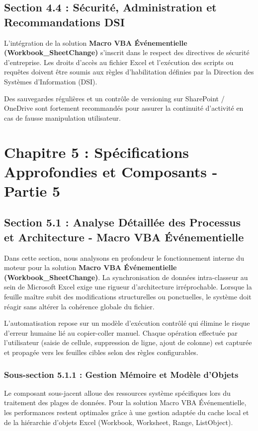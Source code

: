 \documentclass[12pt,a4paper]{report}
\begin{document}
\section{Section 4.4 : Sécurité, Administration et Recommandations DSI}
L'intégration de la solution \textbf{Macro VBA Événementielle (Workbook\_SheetChange)} s'inscrit dans le respect des directives de sécurité d'entreprise. Les droits d'accès au fichier Excel et l'exécution des scripts ou requêtes doivent être soumis aux règles d'habilitation définies par la Direction des Systèmes d'Information (DSI).

Des sauvegardes régulières et un contrôle de versioning sur SharePoint / OneDrive sont fortement recommandés pour assurer la continuité d'activité en cas de fausse manipulation utilisateur.


\chapter{Chapitre 5 : Spécifications Approfondies et Composants - Partie 5}

\section{Section 5.1 : Analyse Détaillée des Processus et Architecture - Macro VBA Événementielle}
Dans cette section, nous analysons en profondeur le fonctionnement interne du moteur pour la solution \textbf{Macro VBA Événementielle (Workbook\_SheetChange)}. La synchronisation de données intra-classeur au sein de Microsoft Excel exige une rigueur d'architecture irréprochable. Lorsque la feuille maître subit des modifications structurelles ou ponctuelles, le système doit réagir sans altérer la cohérence globale du fichier.

L'automatisation repose sur un modèle d'exécution contrôlé qui élimine le risque d'erreur humaine lié au copier-coller manuel. Chaque opération effectuée par l'utilisateur (saisie de cellule, suppression de ligne, ajout de colonne) est capturée et propagée vers les feuilles cibles selon des règles configurables.


\subsection{Sous-section 5.1.1 : Gestion Mémoire et Modèle d'Objets}
Le composant sous-jacent alloue des ressources système spécifiques lors du traitement des plages de données. Pour la solution Macro VBA Événementielle, les performances restent optimales grâce à une gestion adaptée du cache local et de la hiérarchie d'objets Excel (Workbook, Worksheet, Range, ListObject).
\end{document}
